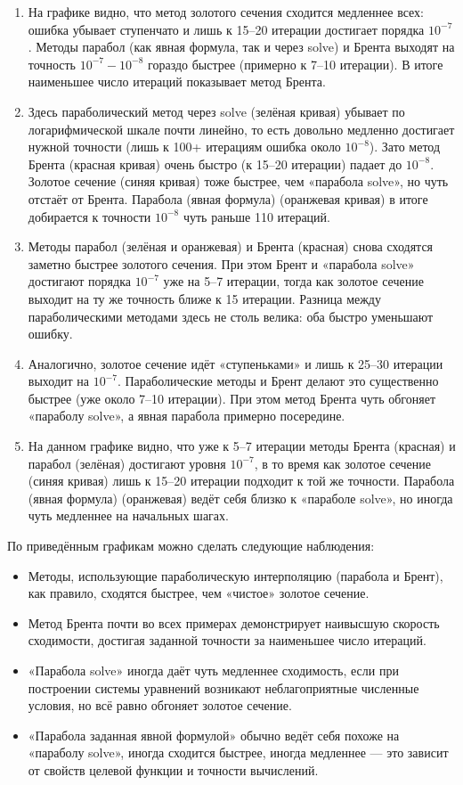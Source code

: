 \documentclass[a4paper,12pt]{article}
\begin{document}
\begin{enumerate}
    \item На графике видно, что метод золотого сечения сходится медленнее всех: ошибка убывает ступенчато и лишь к 15--20 итерации достигает порядка $10^{-7}$. Методы парабол (как явная формула, так и через solve) и Брента выходят на точность $10^{-7}\!-\!10^{-8}$ гораздо быстрее (примерно к 7--10 итерации). В итоге наименьшее число итераций показывает метод Брента.
    \item Здесь параболический метод через solve (зелёная кривая) убывает по логарифмической шкале почти линейно, то есть довольно медленно достигает нужной точности (лишь к 100+ итерациям ошибка около $10^{-8}$). Зато метод Брента (красная кривая) очень быстро (к 15--20 итерации) падает до $10^{-8}$. Золотое сечение (синяя кривая) тоже быстрее, чем «парабола solve», но чуть отстаёт от Брента. Парабола (явная формула) (оранжевая кривая) в итоге добирается к точности $10^{-8}$ чуть раньше 110 итераций.
    \item Методы парабол (зелёная и оранжевая) и Брента (красная) снова сходятся заметно быстрее золотого сечения. При этом Брент и «парабола solve» достигают порядка $10^{-7}$ уже на 5--7 итерации, тогда как золотое сечение выходит на ту же точность ближе к 15 итерации. Разница между параболическими методами здесь не столь велика: оба быстро уменьшают ошибку.
    \item Аналогично, золотое сечение идёт «ступеньками» и лишь к 25--30 итерации выходит на $10^{-7}$. Параболические методы и Брент делают это существенно быстрее (уже около 7--10 итерации). При этом метод Брента чуть обгоняет «параболу solve», а явная парабола примерно посередине.
    \item На данном графике видно, что уже к 5--7 итерации методы Брента (красная) и парабол (зелёная) достигают уровня $10^{-7}$, в то время как золотое сечение (синяя кривая) лишь к 15--20 итерации подходит к той же точности. Парабола (явная формула) (оранжевая) ведёт себя близко к «параболе solve», но иногда чуть медленнее на начальных шагах.
\end{enumerate}
По приведённым графикам можно сделать следующие наблюдения:
\begin{itemize}
    \item Методы, использующие параболическую интерполяцию (парабола и Брент), как правило, сходятся быстрее, чем «чистое» золотое сечение.
    \item Метод Брента почти во всех примерах демонстрирует наивысшую скорость сходимости, достигая заданной точности за наименьшее число итераций.
    \item «Парабола solve» иногда даёт чуть медленнее сходимость, если при построении системы уравнений возникают неблагоприятные численные условия, но всё равно обгоняет золотое сечение.
    \item «Парабола заданная явной формулой» обычно ведёт себя похоже на «параболу solve», иногда сходится быстрее, иногда медленнее --- это зависит от свойств целевой функции и точности вычислений.
\end{itemize}
\end{document}

